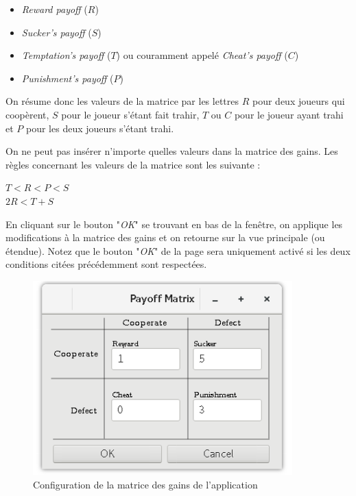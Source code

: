 \documentclass[a4paper]{article}
\begin{document}
\begin{itemize}
    \item \textit{Reward payoff} ($R$)
    \item \textit{Sucker's payoff} ($S$)
    \item \textit{Temptation's payoff} ($T$) ou couramment appelé \textit{Cheat's payoff} ($C$) 
    \item \textit{Punishment's payoff} ($P$)
\end{itemize}

On résume donc les valeurs de la matrice par les lettres $R$ pour deux joueurs qui coopèrent, $S$ pour le joueur s'étant fait trahir, $T$ ou $C$ pour le joueur ayant trahi et $P$ pour les deux joueurs s'étant trahi.

On ne peut pas insérer n'importe quelles valeurs dans la matrice des gains. Les règles concernant les valeurs de la matrice sont les suivante :

\begin{framed}
    \centering
    $T < R < P < S$\\
    $2R < T + S$
\end{framed}

En cliquant sur le bouton "\textit{OK}" se trouvant en bas de la fenêtre, on applique les modifications à la matrice des gains et on retourne sur la vue principale (ou étendue). Notez que le bouton "\textit{OK}" de la page sera uniquement activé si les deux conditions citées précédemment sont respectées.

\vfill
\begin{figure}[htp]
    \centering
    \includegraphics[width=10cm]{interface/payoffmatrix.png}
    \caption{Configuration de la matrice des gains de l'application}
\end{figure}
\vfill

\pagebreak
\end{document}
